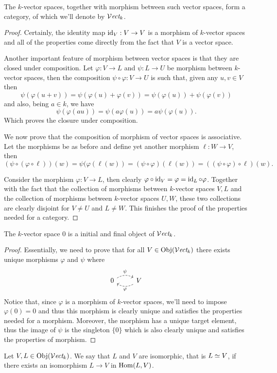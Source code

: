 \begin{proposition}\label{prop: category of vector spaces}
   The \(k\)-vector spaces, together with morphism between such vector spaces,
   form a category, of which we'll denote by \({\mathcal{V}\textit{ect}}_k\).
\end{proposition}

\begin{proof}
   Certainly, the identity map \(\operatorname{id}_V : V \to V\) is a morphism of \(k\)-vector
   spaces and all of the properties come directly from the fact that \(V\) is a
   vector space.

   Another important feature of morphism between vector spaces is that they are
   closed under composition. Let \(\varphi : V \to L\) and \(\psi : L \to U\) be
   morphism between \(k\)-vector spaces, then the composition \(\psi \circ
   \varphi : V \to U\) is such that, given any \(u, v \in V\) then
   \[
      \psi(\varphi(u+v)) = \psi(\varphi(u) + \varphi(v)) = \psi(\varphi(u)) +
      \psi(\varphi(v))
   \]
   and also, being \(a \in k\), we have
   \[
      \psi(\varphi(au)) = \psi(a\varphi(u)) = a \psi(\varphi(u)).
   \]
   Which proves the closure under composition.

   We now prove that the composition of morphism of vector spaces is
   associative. Let the morphisms be as before and define yet another morphism
   \(\ell : W \to V\), then
   \[
      (\psi \circ (\varphi \circ \ell)) (w) = \psi(\varphi(\ell(w)) = (\psi \circ
      \varphi)(\ell(w)) = ((\psi \circ \varphi) \circ \ell) (w).
   \]

   Consider the morphism \(\varphi : V \to L\), then clearly \(\varphi \circ
   \operatorname{id}_V = \varphi = \operatorname{id}_L \circ \varphi\). Together with the fact that the
   collection of morphisms between \(k\)-vector spaces \(V, L\) and the
   collection of morphisms between \(k\)-vector spaces \(U, W\), these two
   collections are clearly disjoint for \(V \neq U\) and \(L \neq W\). This
   finishes the proof of the properties needed for a category.
\end{proof}

\begin{proposition}
   The \(k \)-vector space \(0\) is a initial and final object of
   \({\mathcal{V}\textit{ect}}_k\).
\end{proposition}

\begin{proof}
   Essentially, we need to prove that for all \(V \in \operatorname{Obj}({\mathcal{V}\textit{ect}}_k)\) there
   exists unique morphisms \(\varphi\) and \(\psi\) where
   \[
     \begin{tikzcd}
       0
       \ar[r, bend left, dashed, "\psi"]
         &V
         \ar[l, bend left, dashed, "\varphi"]
     \end{tikzcd}
   \]
   Notice that, since \(\varphi\) is a morphism of \(k\)-vector spaces, we'll
   need to impose \(\varphi(0) = 0\) and thus this morphism is clearly unique
   and satisfies the properties needed for a morphism. Moreover, the morphism
   has a unique target element, thus the image of \(\psi\) is the singleton
   \(\{0\}\) which is also clearly unique and satisfies the properties of
   morphism.
\end{proof}

\begin{definition}[Isomorphism]
   Let \(V, L \in \operatorname{Obj}({\mathcal{V}\textit{ect}}_k)\). We say that \(L\) and \(V\) are
   isomorphic, that is \(L \simeq V\), if there exists an isomorphism \(L \to V\)
   in \(\operatorname{Hom}(L, V)\).
\end{definition}

